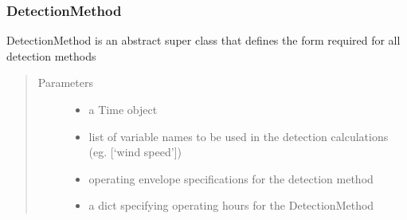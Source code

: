 \documentclass[letterpaper,10pt,english]{sphinxmanual}
\begin{document}
\subsubsection{DetectionMethod}
\label{\detokenize{index:detectionmethod}}

\begin{fulllineitems}
\label{\detokenize{index:feast.DetectionModules.abstract_detection_method.DetectionMethod}}
DetectionMethod is an abstract super class that defines the form required for all detection methods
\begin{quote}\begin{description}
\item[{Parameters}] \leavevmode\begin{itemize}
\item {} 
 \textendash{} a Time object

\item {} 
 \textendash{} list of variable names to be used in the detection calculations (eg. {[}‘wind speed’{]})

\item {} 
 \textendash{} operating envelope specifications for the detection method

\item {} 
 \textendash{} a dict specifying operating hours for the DetectionMethod

\end{itemize}

\end{description}\end{quote}


\end{fulllineitems}
\end{document}
